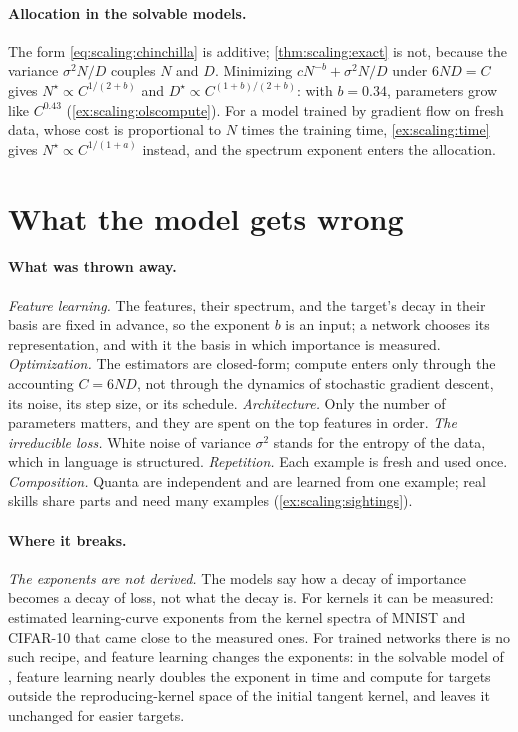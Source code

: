 \begin{refsection}
\paragraph{Allocation in the solvable models.} The form \eqref{eq:scaling:chinchilla} is additive; \cref{thm:scaling:exact} is not, because the variance $\sigma^2N/D$ couples $N$ and $D$. Minimizing $cN^{-b}+\sigma^2N/D$ under $6ND=C$ gives $N^\star\propto C^{1/(2+b)}$ and $D^\star\propto C^{(1+b)/(2+b)}$: with $b=0.34$, parameters grow like $C^{0.43}$ (\cref{ex:scaling:olscompute}). For a model trained by gradient flow on fresh data, whose cost is proportional to $N$ times the training time, \cref{ex:scaling:time} gives $N^\star\propto C^{1/(1+a)}$ instead, and the spectrum exponent enters the allocation.

\section{What the model gets wrong}\label{sec:scaling:wrong}

\paragraph{What was thrown away.} \emph{Feature learning.} The features, their spectrum, and the target's decay in their basis are fixed in advance, so the exponent $b$ is an input; a network chooses its representation, and with it the basis in which importance is measured. \emph{Optimization.} The estimators are closed-form; compute enters only through the accounting $C=6ND$, not through the dynamics of stochastic gradient descent, its noise, its step size, or its schedule. \emph{Architecture.} Only the number of parameters matters, and they are spent on the top features in order. \emph{The irreducible loss.} White noise of variance $\sigma^2$ stands for the entropy of the data, which in language is structured. \emph{Repetition.} Each example is fresh and used once. \emph{Composition.} Quanta are independent and are learned from one example; real skills share parts and need many examples (\cref{ex:scaling:sightings}).

\paragraph{Where it breaks.} \emph{The exponents are not derived.} The models say how a decay of importance becomes a decay of loss, not what the decay is. For kernels it can be measured: \textcite{SpiglerEtAl2020} estimated learning-curve exponents from the kernel spectra of MNIST and CIFAR-10 that came close to the measured ones. For trained networks there is no such recipe, and feature learning changes the exponents: in the solvable model of \textcite{BordelonEtAl2025}, feature learning nearly doubles the exponent in time and compute for targets outside the reproducing-kernel space of the initial tangent kernel, and leaves it unchanged for easier targets.


\end{refsection}
